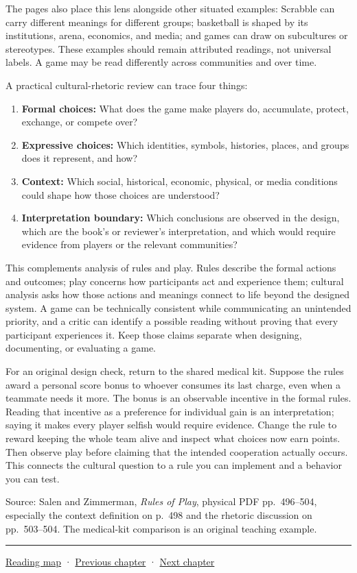 The pages also place this lens alongside other situated examples: Scrabble can carry different meanings for different groups; basketball is shaped by its institutions, arena, economics, and media; and games can draw on subcultures or stereotypes. These examples should remain attributed readings, not universal labels. A game may be read differently across communities and over time.

A practical cultural-rhetoric review can trace four things:

\begin{enumerate}
\def\labelenumi{\arabic{enumi}.}
\tightlist
\item
  \textbf{Formal choices:} What does the game make players do, accumulate, protect, exchange, or compete over?
\item
  \textbf{Expressive choices:} Which identities, symbols, histories, places, and groups does it represent, and how?
\item
  \textbf{Context:} Which social, historical, economic, physical, or media conditions could shape how those choices are understood?
\item
  \textbf{Interpretation boundary:} Which conclusions are observed in the design, which are the book's or reviewer's interpretation, and which would require evidence from players or the relevant communities?
\end{enumerate}

This complements analysis of rules and play. Rules describe the formal actions and outcomes; play concerns how participants act and experience them; cultural analysis asks how those actions and meanings connect to life beyond the designed system. A game can be technically consistent while communicating an unintended priority, and a critic can identify a possible reading without proving that every participant experiences it. Keep those claims separate when designing, documenting, or evaluating a game.

For an original design check, return to the shared medical kit. Suppose the rules award a personal score bonus to whoever consumes its last charge, even when a teammate needs it more. The bonus is an observable incentive in the formal rules. Reading that incentive as a preference for individual gain is an interpretation; saying it makes every player selfish would require evidence. Change the rule to reward keeping the whole team alive and inspect what choices now earn points. Then observe play before claiming that the intended cooperation actually occurs. This connects the cultural question to a rule you can implement and a behavior you can test.

Source: Salen and Zimmerman, \emph{Rules of Play}, physical PDF pp.~496--504, especially the context definition on p.~498 and the rhetoric discussion on pp.~503--504. The medical-kit comparison is an original teaching example.

\begin{center}\rule{0.5\linewidth}{0.5pt}\end{center}

\hyperref[volume-reading-map]{Reading map} · \hyperref[05-engine-i-ch008]{Previous chapter} · \hyperref[05-engine-i-ch010]{Next chapter}
